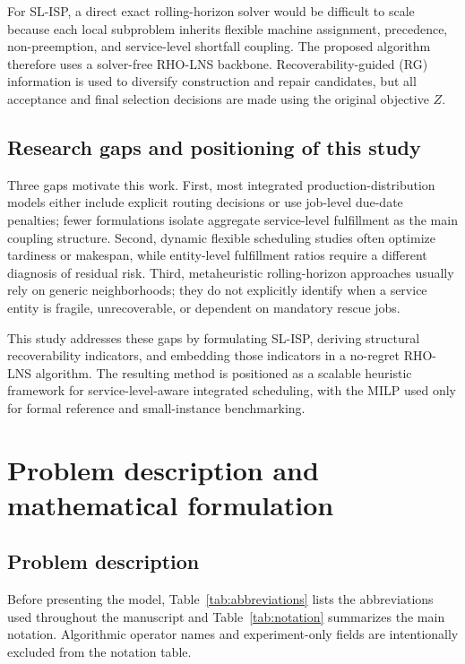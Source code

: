 \documentclass[a4paper,fleqn]{cas-sc}
\begin{document}
For SL-ISP, a direct exact rolling-horizon solver would be difficult to scale because each local subproblem inherits flexible machine assignment, precedence, non-preemption, and service-level shortfall coupling. The proposed algorithm therefore uses a solver-free RHO-LNS backbone. Recoverability-guided (RG) information is used to diversify construction and repair candidates, but all acceptance and final selection decisions are made using the original objective \(Z\).

\subsection{Research gaps and positioning of this study}
\label{sec:lit_gaps}

Three gaps motivate this work. First, most integrated production-distribution models either include explicit routing decisions or use job-level due-date penalties; fewer formulations isolate aggregate service-level fulfillment as the main coupling structure. Second, dynamic flexible scheduling studies often optimize tardiness or makespan, while entity-level fulfillment ratios require a different diagnosis of residual risk. Third, metaheuristic rolling-horizon approaches usually rely on generic neighborhoods; they do not explicitly identify when a service entity is fragile, unrecoverable, or dependent on mandatory rescue jobs.

This study addresses these gaps by formulating SL-ISP, deriving structural recoverability indicators, and embedding those indicators in a no-regret RHO-LNS algorithm. The resulting method is positioned as a scalable heuristic framework for service-level-aware integrated scheduling, with the MILP used only for formal reference and small-instance benchmarking.

\section{Problem description and mathematical formulation}
\label{sec:problem}

\subsection{Problem description}
\label{sec:problem_description}

Before presenting the model, Table~\ref{tab:abbreviations} lists the abbreviations used throughout the manuscript and Table~\ref{tab:notation} summarizes the main notation. Algorithmic operator names and experiment-only fields are intentionally excluded from the notation table.
\end{document}
